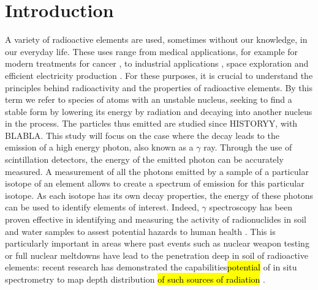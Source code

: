 \section{Introduction}
A variety of radioactive elements are used, sometimes without our knowledge, in our everyday life.
These uses range from medical applications, for example for modern treatments for cancer \cite{andrea_galindo_what_2023}, to industrial applications \cite{ramadhany_assessment_2022}, space exploration \cite{klingelhofer_mossbauer_2004} and efficient electricity production \cite{andrea_galindo_what_2023}.
For these purposes, it is crucial to understand the principles behind radioactivity and the properties of radioactive elements.
By this term we refer to species of atoms with an unstable nucleus, seeking to find a stable form by lowering its energy by radiation and decaying into another nucleus in the process.
The particles thus emitted are studied since HISTORYY, with BLABLA.
This study will focus on the case where the decay leads to the emission of a high energy photon, also known as a \(\gamma\) ray.
Through the use of scintillation detectors, the energy of the emitted photon can be accurately measured.
A measurement of all the photons emitted by a sample of a particular isotope of an element allows to create a spectrum of emission for this particular isotope.
As each isotope has its own decay properties, the energy of these photons can be used to identify elements of interest.
Indeed, $\gamma$ spectroscopy has been proven effective in identifying and measuring the activity of radionuclides in soil and water samples to assest potential hazards to human health \cite{ramadhany_assessment_2022} \cite{kim_design_2022}.
This is particularly important in areas where past events such as nuclear weapon testing or full nuclear meltdowns have lead to the penetration deep in soil of radioactive elements: 
recent research has demonstrated the capabilities\hl{potential} of in situ spectrometry to map depth distribution \hl{of such sources of radiation} \cite{varley_situ_2017}.
